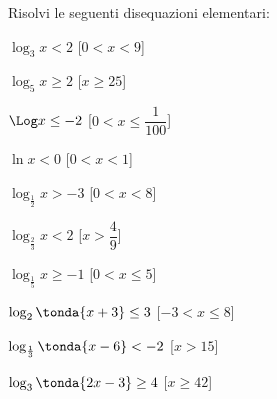 \begin{esercizio}\label{ese:}
 Risolvi le seguenti disequazioni elementari:
 \begin{multicols}{2}
 \begin{enumeratea}
   \item \(\log_3 x < 2\)
   \hfill [\( 0<x<9\)]
   \item \(\log_5 x \geq 2\)
   \hfill [\(x\geq 25\)]
   \item \(\Log x \leq -2\)
   \hfill [\( 0<x\leq \dfrac{1}{100}\)]
   \item \(\ln x < 0\)
   \hfill [\( 0 < x <1\)]
   \item \(\log_{\frac{1}{2}} x > -3\)
   \hfill [\(0<x<8\)]
   \item \(\log_{\frac{2}{3}} x < 2\)
   \hfill [\( x>\dfrac{4}{9}\)]
   \item \(\log_{\frac{1}{5}} x \geq -1\)
   \hfill [\(0<x\leq 5\)]
   \item \(\log_2 \tonda{x+3} \leq 3\)
   \hfill [\(-3<x\leq 8\)]
   \item \(\log_{\frac{1}{3}} \tonda{x-6} < -2\)
   \hfill [\(x>15\)]
   \item \(\log_3 \tonda{2x-3}\geq 4\)
   \hfill [\(x \geq 42\)]
 \end{enumeratea}
 \end{multicols}
\end{esercizio}



